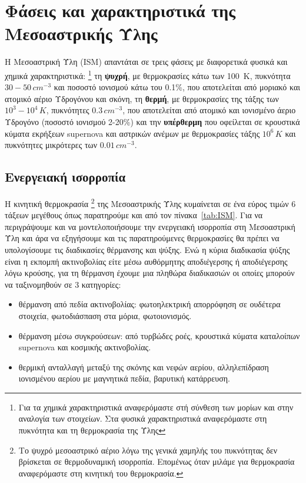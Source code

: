 \documentclass[a4paper,12pt]{memoir}
\begin{document}
\section{Φάσεις και χαρακτηριστικά της Μεσοαστρικής Ύλης}
Η Μεσοαστρική Ύλη (ISM) απαντάται σε τρεις φάσεις με διαφορετικά φυσικά και χημικά χαρακτηριστικά: 
\footnote{Για τα χημικά χαρακτηριστικά αναφερόμαστε στή σύνθεση των μορίων και στην αναλογία των στοιχείων. Στα φυσικά χαρακτηριστικά αναφερόμαστε στη πυκνότητα και τη θερμοκρασία της Ύλης} 
τη \textbf{ψυχρή}, με θερμοκρασίες κάτω των \SI{100}{\kelvin}, πυκνότητα $30-50\, cm^{-3}$ και ποσοστό ιονισμού κάτω του 0.1\%, που αποτελείται από μοριακό και ατομικό αέριο Υδρογόνου και σκόνη, τη \textbf{θερμή}, με θερμοκρασίες της τάξης των $10^3-10^4\,K$, πυκνότητες $0.3\, cm^{-3}$, που αποτελείται από ατομικό και ιονισμένο άεριο Υδρογόνο (ποσοστό ιονισμού 2-20\%) και την \textbf{υπέρθερμη} που οφείλεται σε κρουστικά κύματα εκρήξεων supernova και αστρικών ανέμων με θερμοκρασίες τάξης $10^6 \,K$ και πυκνότητες μικρότερες των $0.01\, cm^{-3}$.


\subsection{Ενεργειακή ισορροπία}
\label{par:EnergyBalance}
Η κινητική θερμοκρασία \footnote{Το ψυχρό μεσοαστρικό αέριο λόγω της γενικά χαμηλής του πυκνότητας δεν βρίσκεται σε θερμοδυναμική ισορροπία. Επομένως όταν μιλάμε για θερμοκρασία αναφερόμαστε στη κινητική του θερμοκρασία.\cite[p. 28]{spitzer_1998}} της Μεσοαστρικής Ύλης κυμαίνεται σε ένα εύρος τιμών 6 τάξεων μεγέθους όπως παρατηρούμε και από τον πίνακα~\ref{tab:ISM}. Για να περιγράψουμε και να μοντελοποιήσουμε την ενεργειακή ισορροπία στη Μεσοαστρική Ύλη και άρα να εξηγήσουμε και τις παρατηρούμενες θερμοκρασίες θα πρέπει να υπολογίσουμε τις διαδικασίες θέρμανσης και ψύξης. 
Ενώ η κύρια διαδικασία ψύξης είναι η εκπομπή ακτινοβολίας είτε μέσω αυθόρμητης αποδιέγερσης ή αποδιέγερσης λόγω κρούσης, για τη θέρμανση έχουμε μια πληθώρα διαδικασιών οι οποίες μπορούν να ταξινομηθούν σε 3 κατηγορίες:

\begin{itemize}
	\item θέρμανση από πεδία ακτινοβολίας: φωτοηλεκτρική απορρόφηση σε ουδέτερα στοιχεία, φωτοδιάσπαση στα μόρια, φωτοιονισμός.
	\item θέρμανση μέσω συγκρούσεων: από τυρβώδες ροές, κρουστικά κύματα καταλοίπων supernova και κοσμικής ακτινοβολίας.
	\item θερμική ανταλλαγή μεταξύ της σκόνης και νεφών αερίου, αλληλεπίδραση ιονισμένου αερίου με μαγνητικά πεδία, βαρυτική κατάρρευση. 
\end{itemize}
\end{document}
